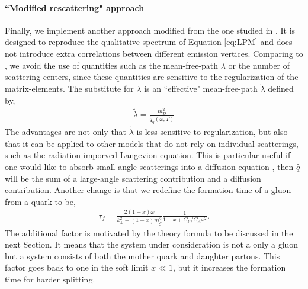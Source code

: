 \documentclass[aps, prc, reprint, amsmath, groupedaddress, nofootinbib]{revtex4-1}
\begin{document}
\paragraph*{``Modified rescattering" approach} Finally, we implement another approach modified from the one studied in \cite{Zapp:2011ya,Park:thesis,Park:2016jap}.
It is designed to reproduce the qualitative spectrum of Equation \ref{eq:LPM} and does not introduce extra correlations between different emission vertices. 
Comparing to \cite{Zapp:2011ya}, we avoid the use of quantities such as the mean-free-path $\lambda$ or the number of scattering centers, since these quantities are sensitive to the regularization of the matrix-elements. 
The substitute for $\lambda$ is an ``effective" mean-free-path $\tilde{\lambda}$ defined by,
\begin{eqnarray}\label{eq:effmpf}
\tilde{\lambda} = \frac{m_D^2}{\hat{q}_g(\omega, T)}
\end{eqnarray}
The advantages are not only that $\tilde{\lambda}$ is less sensitive to regularization, but also that it can be applied to other models that do not rely on individual scatterings, such as the radiation-imporved Langevion equation.
This is particular useful if one would like to absorb small angle scatterings into a diffusion equation \cite{Ghiglieri:2015ala}, then $\hat{q}$ will be the sum of a large-angle scattering contribution and a diffusion contribution.
Another change is that we redefine the formation time of a gluon from a quark to be,
\begin{eqnarray}\label{eq:formation-time-def}
\tau_f = \frac{2(1-x)\omega}{k_\perp^2 + (1-x)m_g^2}\frac{1}{1-x+C_F/C_A x^2}.
\end{eqnarray}
The additional factor is motivated by the theory formula to be discussed in the next Section.
It means that the system under consideration is not a only a gluon but a system consists of both the mother quark and daughter partons. 
This factor goes back to one in the soft limit $x\ll 1$, but it increases the formation time for harder splitting. 
\end{document}
